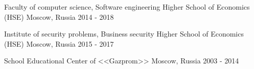 


\begin{cventries}
\cventry
{Faculty of computer science, Software engineering} %
{Higher School of Economics (HSE)} %
{Moscow, Russia} %
{2014 - 2018} %
{ %
}


\cventry
{Institute of security problems, Business security} %
{Higher School of Economics (HSE)} %
{Moscow, Russia} %
{2015 - 2017} %
{ %
}


\cventry
{School} %
{Educational Center of <<Gazprom>>} %
{Moscow, Russia} %
{2003 - 2014} %
{ %
}


\end{cventries}